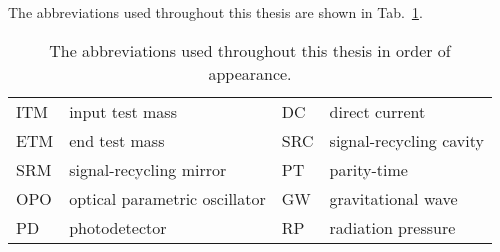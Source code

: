 The abbreviations used throughout this thesis are shown in Tab.~\ref{tab:abbreviations}.

\begin{table}[h]
\centering
\begin{tabular}{@{}ll|ll@{}}
\toprule
ITM & input test mass & DC & direct current \\
ETM & end test mass & SRC & signal-recycling cavity \\
SRM & signal-recycling mirror & PT & parity-time \\
OPO & optical parametric oscillator & GW & gravitational wave \\
PD & photodetector & RP & radiation pressure \\ \bottomrule
\end{tabular}
\caption{The abbreviations used throughout this thesis in order of appearance.}
\label{tab:abbreviations}
\end{table}





